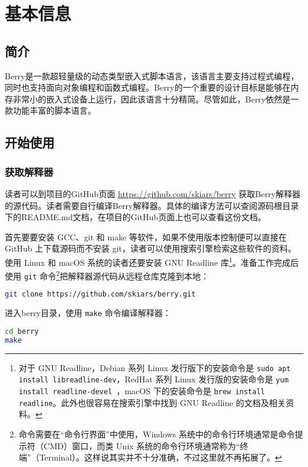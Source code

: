 \chapter{基本信息}

\section{简介}

Berry是一款超轻量级的动态类型嵌入式脚本语言，该语言主要支持过程式编程，同时也支持面向对象编程和函数式编程。Berry的一个重要的设计目标是能够在内存非常小的嵌入式设备上运行，因此该语言十分精简。尽管如此，Berry依然是一款功能丰富的脚本语言。

\section{开始使用}

\subsection{获取解释器}

读者可以到项目的GitHub页面 \url{https://github.com/skiars/berry} 获取Berry解释器的源代码。读者需要自行编译Berry解释器。具体的编译方法可以查阅源码根目录下的README.md文档，在项目的GitHub页面上也可以查看这份文档。

首先要要安装 GCC、git 和 make 等软件，如果不使用版本控制便可以直接在 GitHub 上下载源码而不安装 git，读者可以使用搜索引擎检索这些软件的资料。使用 Linux 和 macOS 系统的读者还要安装 GNU Readline 库\footnote{对于 GNU Readline，Debian 系列 Linux 发行版下的安装命令是 \texttt{sudo apt install libreadline-dev}，RedHat 系列 Linux 发行版的安装命令是 \texttt{yum install readline-devel }，macOS 下的安装命令是 \texttt{brew install readline}。此外也很容易在搜索引擎中找到 GNU Readline 的文档及相关资料。}。准备工作完成后使用 \texttt{git} 命令\footnote{命令需要在“命令行界面”中使用，Windows 系统中的命令行环境通常是命令提示符（CMD）窗口，而类 Unix 系统的命令行环境通常称为“终端”（Terminal）。这样说其实并不十分准确，不过这里就不再拓展了。}把解释器源代码从远程仓库克隆到本地：
\begin{lstlisting}[language=bash, numbers=none]
git clone https://github.com/skiars/berry.git
\end{lstlisting}
进入berry目录，使用 \texttt{make} 命令编译解释器：
\begin{lstlisting}[language=bash, numbers=none]
cd berry
make
\end{lstlisting}

